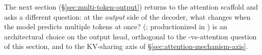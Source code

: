 The next section (\S\ref{sec:multi-token-output}) returns to the
attention scaffold and asks a different question: at the
\emph{output} side of the decoder, what changes when the model predicts
multiple tokens at once? 
(\citealp{gloeckle2024-mtp}; productionized in
\citealp{deepseek-v3}) is an architectural choice on the output head,
orthogonal to the -vs-attention question of this section, and to the
KV-sharing axis of \S\ref{sec:attention-mechanism-axis}.
